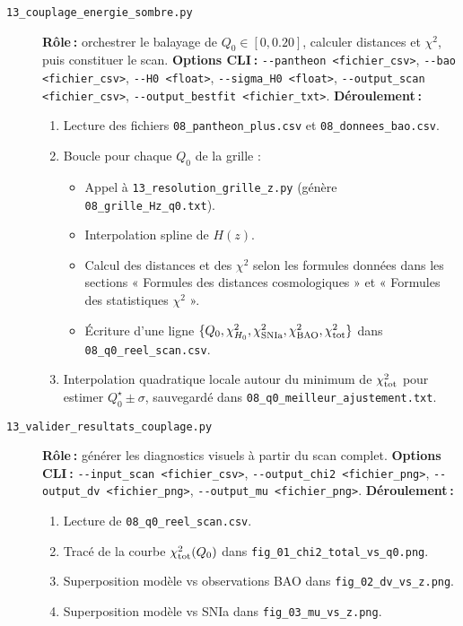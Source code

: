 \begin{description}
  \item[\texttt{13\_couplage\_energie\_sombre.py}]  
    \textbf{Rôle :} orchestrer le balayage de \(Q_{0}\in[0,0.20]\), calculer distances et \(\chi^2\), puis constituer le scan.  
    \textbf{Options CLI :}  
      \verb|--pantheon <fichier_csv>|,  
      \verb|--bao <fichier_csv>|,  
      \verb|--H0 <float>|,  
      \verb|--sigma_H0 <float>|,  
      \verb|--output_scan <fichier_csv>|,  
      \verb|--output_bestfit <fichier_txt>|.  
    \textbf{Déroulement :}
    \begin{enumerate}
      \item Lecture des fichiers \texttt{08\_pantheon\_plus.csv} et \texttt{08\_donnees\_bao.csv}.  
      \item Boucle pour chaque \(Q_{0}\) de la grille :
        \begin{itemize}
          \item Appel à \texttt{13\_resolution\_grille\_z.py} (génère \texttt{08\_grille\_Hz\_q0.txt}).  
          \item Interpolation spline de \(H(z)\).  
           \item Calcul des distances et des \(\chi^2\) selon les formules données dans les sections « Formules des distances cosmologiques » et « Formules des statistiques \(\chi^2\) ».
          \item Écriture d’une ligne \(\{Q_{0},\chi^{2}_{H_{0}},\chi^{2}_{\rm SNIa},\chi^{2}_{\rm BAO},\chi^{2}_{\rm tot}\}\)  
                dans \texttt{08\_q0\_reel\_scan.csv}.  
        \end{itemize}
      \item Interpolation quadratique locale autour du minimum de \(\chi^{2}_{\rm tot}\)  
            pour estimer \(Q_{0}^{\star}\pm\sigma\), sauvegardé dans \texttt{08\_q0\_meilleur\_ajustement.txt}.  
    \end{enumerate}

  \item[\texttt{13\_valider\_resultats\_couplage.py}]  
    \textbf{Rôle :} générer les diagnostics visuels à partir du scan complet.  
    \textbf{Options CLI :}  
      \verb|--input_scan <fichier_csv>|,  
      \verb|--output_chi2 <fichier_png>|,  
      \verb|--output_dv <fichier_png>|,  
      \verb|--output_mu <fichier_png>|.  
    \textbf{Déroulement :}
    \begin{enumerate}
      \item Lecture de \texttt{08\_q0\_reel\_scan.csv}.  
      \item Tracé de la courbe \(\chi^{2}_{\rm tot}(Q_{0})\) dans \texttt{fig\_01\_chi2\_total\_vs\_q0.png}.  
      \item Superposition modèle vs observations BAO dans \texttt{fig\_02\_dv\_vs\_z.png}.  
      \item Superposition modèle vs SNIa dans \texttt{fig\_03\_mu\_vs\_z.png}.  
    \end{enumerate}
\end{description}

